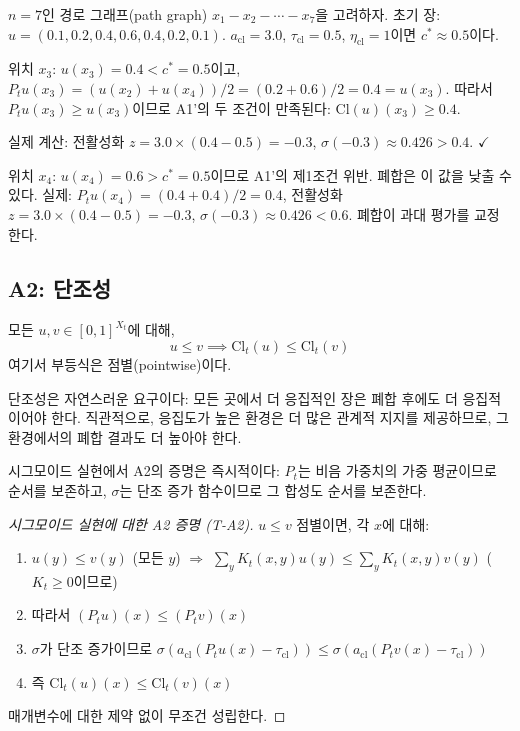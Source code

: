 \begin{example}[1D 경로 그래프에서의 A1']
$n = 7$인 경로 그래프(path graph) $x_1 - x_2 - \cdots - x_7$을 고려하자. 초기 장: $u = (0.1, 0.2, 0.4, 0.6, 0.4, 0.2, 0.1)$. $a_{\mathrm{cl}} = 3.0$, $\tau_{\mathrm{cl}} = 0.5$, $\eta_{\mathrm{cl}} = 1$이면 $c^* \approx 0.5$이다.

위치 $x_3$: $u(x_3) = 0.4 < c^* = 0.5$이고, $P_t u(x_3) = (u(x_2) + u(x_4))/2 = (0.2 + 0.6)/2 = 0.4 = u(x_3)$. 따라서 $P_t u(x_3) \geq u(x_3)$이므로 A1'의 두 조건이 만족된다: $\mathrm{Cl}(u)(x_3) \geq 0.4$.

실제 계산: 전활성화 $z = 3.0 \times (0.4 - 0.5) = -0.3$, $\sigma(-0.3) \approx 0.426 > 0.4$. $\checkmark$

위치 $x_4$: $u(x_4) = 0.6 > c^* = 0.5$이므로 A1'의 제1조건 위반. 폐합은 이 값을 낮출 수 있다. 실제: $P_t u(x_4) = (0.4 + 0.4)/2 = 0.4$, 전활성화 $z = 3.0 \times (0.4 - 0.5) = -0.3$, $\sigma(-0.3) \approx 0.426 < 0.6$. 폐합이 과대 평가를 교정한다.
\end{example}


\subsection{A2: 단조성}

\begin{axiom}[A2: 단조성]
\label{ax:A2}
모든 $u, v \in [0,1]^{X_t}$에 대해,
\begin{equation}
    u \leq v \implies \mathrm{Cl}_t(u) \leq \mathrm{Cl}_t(v)
\end{equation}
여기서 부등식은 점별(pointwise)이다.
\end{axiom}

단조성은 자연스러운 요구이다: 모든 곳에서 더 응집적인 장은 폐합 후에도 더 응집적이어야 한다. 직관적으로, 응집도가 높은 환경은 더 많은 관계적 지지를 제공하므로, 그 환경에서의 폐합 결과도 더 높아야 한다.

시그모이드 실현에서 A2의 증명은 즉시적이다: $P_t$는 비음 가중치의 가중 평균이므로 순서를 보존하고, $\sigma$는 단조 증가 함수이므로 그 합성도 순서를 보존한다.

\begin{proof}[시그모이드 실현에 대한 A2 증명 (T-A2)]
$u \leq v$ 점별이면, 각 $x$에 대해:
\begin{enumerate}
    \item $u(y) \leq v(y)$ (모든 $y$) $\Rightarrow$ $\sum_y K_t(x,y) u(y) \leq \sum_y K_t(x,y) v(y)$ ($K_t \geq 0$이므로)
    \item 따라서 $(P_t u)(x) \leq (P_t v)(x)$
    \item $\sigma$가 단조 증가이므로 $\sigma(a_{\mathrm{cl}}(P_t u(x) - \tau_{\mathrm{cl}})) \leq \sigma(a_{\mathrm{cl}}(P_t v(x) - \tau_{\mathrm{cl}}))$
    \item 즉 $\mathrm{Cl}_t(u)(x) \leq \mathrm{Cl}_t(v)(x)$
\end{enumerate}
매개변수에 대한 제약 없이 무조건 성립한다.
\end{proof}

